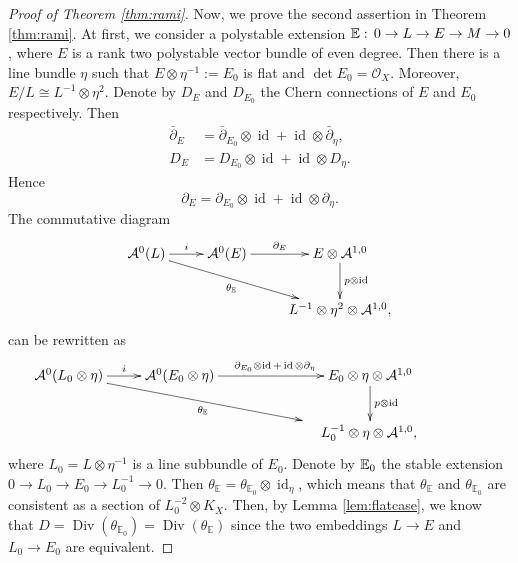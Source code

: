 \documentclass[12pt]{article}
\begin{document}
\begin{proof}[Proof of Theorem \ref{thm:rami}]
Now, we prove the second assertion in Theorem \ref{thm:rami}. At first, we consider a polystable extension ${\Bbb E}:\, 0\to L\to E\to M \to 0$, where $E$ is a rank two polystable vector bundle of even degree. Then there is a line bundle $\eta$ such that $E \otimes \eta^{-1} := E_{0}$ is flat and $\det E_{0} = \mathcal O_{X}$. Moreover, $E/L \cong L^{-1} \otimes \eta^{2}$. Denote by $D_{E}$ and $D_{E_{0}}$ the Chern connections of $E$ and $E_{0}$ respectively. Then
\begin{align*}
\bar{\partial}_{E} & = \bar{\partial}_{E_{0}} \otimes \operatorname{id} + \operatorname{id} \otimes \bar{\partial}_{\eta}, \\
D_{E} & = D_{E_{0}} \otimes \operatorname{id} + \operatorname{id} \otimes D_{\eta}.
\end{align*}
Hence
\[ \partial_{E} = \partial_{E_{0}} \otimes \operatorname{id} + \operatorname{id} \otimes \partial_{\eta}. \]
The commutative diagram
\[\xymatrix{
 \mathcal A^{0}(L)\ar[r] ^-{i}\ar[drr]_-{\theta_{\mathbb E}} & \mathcal A^{0}(E)\ar[r] ^-{\partial_{E}} & E\otimes \mathcal{A}^{1,0}\ar[d]^-{p \otimes \operatorname{id}} \\
  & & L^{-1}\otimes \eta^{2} \otimes \mathcal{A}^{1,0},
}\]
can be rewritten as
\[\xymatrix{
 \mathcal A^{0}(L_{0} \otimes \eta)\ar[r] ^-{i}\ar[drr]_-{\theta_{\mathbb E}} & \mathcal A^{0}(E_{0}\otimes \eta)\ar[r] ^{\partial_{E_{0}} \otimes \operatorname{id} + \operatorname{id} \otimes \partial_{\eta}} & E_{0} \otimes\eta\otimes \mathcal{A}^{1,0}\ar[d]^-{p \otimes \operatorname{id}} \\
  & & {}\phantom{changying}L_{0}^{-1}\otimes \eta \otimes \mathcal{A}^{1,0},\phantom{changying}
}\]
where $L_{0} = L\otimes \eta^{-1}$ is a line subbundle of $E_{0}$. Denote by ${\Bbb E}_0$ the stable extension $0\to L_0\to E_0\to L_0^{-1}\to 0$.
Then $\theta_{\mathbb E} = \theta_{\mathbb E_{0}} \otimes \operatorname{id}_{\eta}$, which means that $\theta_{\mathbb E}$ and $\theta_{\mathbb E_{0}}$ are consistent as a section of $L_{0}^{-2} \otimes K_{X}$. Then, by  Lemma \ref{lem:flatcase}, we know that $D = \operatorname{Div}(\theta_{\mathbb E_{0}}) = \operatorname{Div}(\theta_{\mathbb E})$ since the two embeddings $L \to E$ and $L_{0} \to E_{0}$ are equivalent.



\end{proof}
\end{document}
